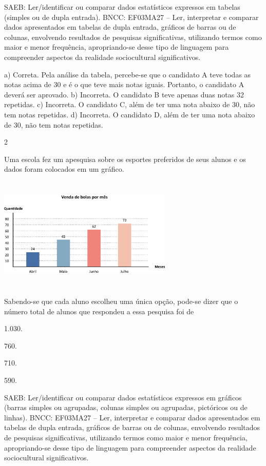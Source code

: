 {\begin{escolha}
{SAEB: Ler/identificar ou comparar dados estatísticos expressos em tabelas (simples ou de dupla entrada). 
BNCC: EF03MA27 -- Ler, interpretar e comparar dados apresentados em tabelas de dupla entrada,
gráficos de barras ou de colunas, envolvendo resultados de pesquisas significativas, utilizando
termos como maior e menor frequência, apropriando-se desse tipo de linguagem para
compreender aspectos da realidade sociocultural significativos.


a) Correta. Pela análise da tabela, percebe-se que o candidato A teve todas as notas
acima de 30 e é o que teve mais notas iguais. Portanto, o candidato A
deverá ser aprovado.
b) Incorreta. O candidato B teve apenas duas notas 32 repetidas.
c) Incorreta. O candidato C, além de ter uma nota abaixo de 30, não tem notas repetidas.
d) Incorreta. O candidato D, além de ter uma nota abaixo de 30, não tem notas repetidas.

\num{2}

Uma escola fez um apesquisa sobre os esportes preferidos de seus alunos
e os dados foram colocados em um gráfico.


\includegraphics[width=3.25862in,height=2.14185in]{media/image105.png}

Sabendo-se que cada aluno escolheu uma única opção, pode-se dizer que o
número total de alunos que respondeu a essa pesquisa foi de

\begin{escolha}
\item
  1.030.
\item
  760.
\item
  710.
\item
  590.
\end{escolha}

SAEB: Ler/identificar ou comparar dados estatísticos expressos em gráficos (barras simples ou agrupadas, colunas simples ou agrupadas, pictóricos ou de linhas). 
BNCC: EF03MA27 -- Ler, interpretar e comparar dados apresentados em tabelas de dupla entrada,
gráficos de barras ou de colunas, envolvendo resultados de pesquisas significativas, utilizando
termos como maior e menor frequência, apropriando-se desse tipo de linguagem para
compreender aspectos da realidade sociocultural significativos.

}
\end{escolha}}
